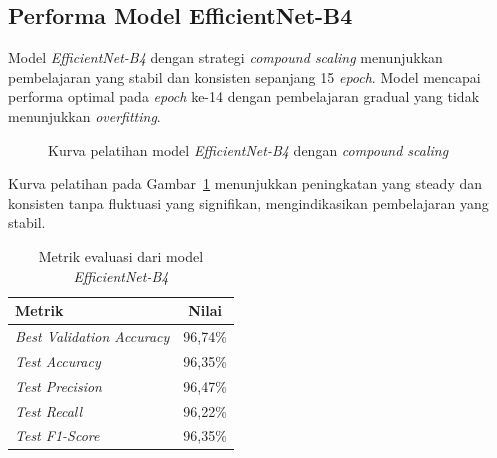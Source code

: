 \subsection{Performa Model EfficientNet-B4}

Model \textit{EfficientNet-B4} dengan strategi \textit{compound scaling} menunjukkan pembelajaran yang stabil dan konsisten sepanjang 15 \textit{epoch}. Model mencapai performa optimal pada \textit{epoch} ke-14 dengan pembelajaran gradual yang tidak menunjukkan \textit{overfitting}.

\begin{figure}[H]
    \centering
    \caption{Kurva pelatihan model \textit{EfficientNet-B4} dengan \textit{compound scaling}}
    \label{fig:efficientnet_training}
\end{figure}

Kurva pelatihan pada Gambar~\ref{fig:efficientnet_training} menunjukkan peningkatan yang steady dan konsisten tanpa fluktuasi yang signifikan, mengindikasikan pembelajaran yang stabil.

\begin{table}[H]
\centering
\caption{Metrik evaluasi dari model \textit{EfficientNet-B4}}
\label{tab:efficientnet_results}
\begin{tabular}{|l|c|}
\hline
\textbf{Metrik} & \textbf{Nilai} \\
\hline
\textit{Best Validation Accuracy} & 96,74\% \\
\textit{Test Accuracy} & 96,35\% \\
\textit{Test Precision} & 96,47\% \\
\textit{Test Recall} & 96,22\% \\
\textit{Test F1-Score} & 96,35\% \\
\hline
\end{tabular}
\end{table}

